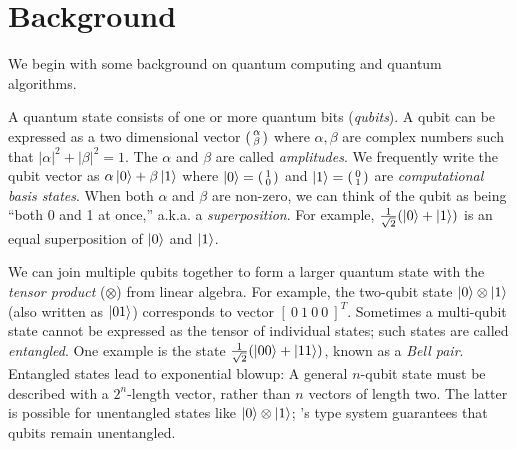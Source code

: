 \section{Background}
\label{sec:background}

We begin with some background on quantum computing and quantum algorithms. 

 A quantum state consists of one or more quantum bits (\emph{qubits}). A qubit can be expressed as a two dimensional vector $\begin{psmallmatrix} \alpha \\ \beta \end{psmallmatrix}$ where $\alpha,\beta$ are complex numbers such that $|\alpha|^2 + |\beta|^2 = 1$.  The $\alpha$ and $\beta$ are called \emph{amplitudes}. 
%
We frequently write the qubit vector as $\alpha\left\vert{0}\right\rangle + \beta\left\vert{1}\right\rangle$ where $\left\vert{0}\right\rangle = \begin{psmallmatrix} 1 \\ 0 \end{psmallmatrix}$ and $\left\vert{1}\right\rangle = \begin{psmallmatrix} 0 \\ 1 \end{psmallmatrix}$ are \emph{computational basis states}. When both $\alpha$ and $\beta$ are non-zero, we can think of the qubit as being ``both 0 and 1 at once,'' a.k.a. a \emph{superposition}. For example, $\frac{1}{\sqrt{2}}(\left\vert{0}\right\rangle + \left\vert{1}\right\rangle)$ is an equal superposition of $\left\vert{0}\right\rangle$ and $\left\vert{1}\right\rangle$. 

We can join multiple qubits together to form a larger quantum state with the \emph{tensor product} ($\otimes$) from linear algebra. For example, the two-qubit state $\left\vert{0}\right\rangle \otimes \left\vert{1}\right\rangle$ (also written as $\left\vert{01}\right\rangle$) corresponds to vector $[~0~1~0~0~]^T$. 
Sometimes a multi-qubit state cannot be expressed as the tensor of individual states; such states are called \emph{entangled}. One example is the state $\frac{1}{\sqrt{2}}(\left\vert{00}\right\rangle + \left\vert{11}\right\rangle)$, known as a \emph{Bell pair}.
Entangled states lead to exponential blowup: A general $n$-qubit state must be described with a $2^n$-length vector, rather than $n$ vectors of length two. The latter is possible for unentangled states like $\left\vert{0}\right\rangle \otimes \left\vert{1}\right\rangle$; \vqir's type system guarantees that qubits remain unentangled.

